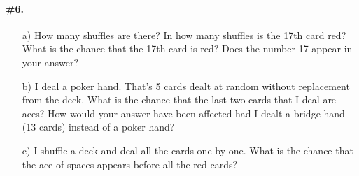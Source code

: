 \documentclass[12pt,titlepage]{article}
\begin{document}
\paragraph{\#6.}
\begin{enumerate}
\item[a)] How many shuffles are there? In how many shuffles is the 17th card red? What is the chance that the 17th card is red? Does the number 17 appear in your answer?
\item[b)] I deal a poker hand. That's 5 cards dealt at random without replacement from the deck. What is the chance that the last two cards that I deal are aces? How would your answer have been affected had I dealt a bridge hand (13 cards) instead of a poker hand?
\item[c)] I shuffle a deck and deal all the cards one by one. What is the chance that the ace of spaces appears before all the red cards?
\end{enumerate}
\end{document}
